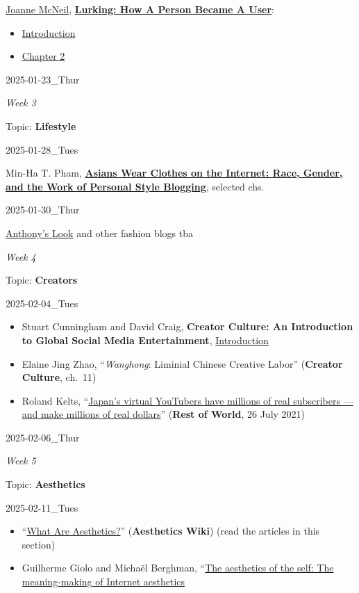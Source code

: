 \documentclass[
  letterpaper,
  DIV=11,
  numbers=noendperiod]{scrartcl}
\providecommand{\tightlist}{%
  \setlength{\itemsep}{0pt}\setlength{\parskip}{0pt}}
\begin{document}
\href{https://joannemcneil.com/}{Joanne McNeil},
\href{https://us.macmillan.com/books/9781250785756/lurking/}{\textbf{Lurking:
How A Person Became A User}}:

\begin{itemize}
\tightlist
\item
  \href{./pdf/Lurking_Intro.pdf}{Introduction}
\item
  \href{./pdf/Lurking_Chapter2.pdf}{Chapter 2}
\end{itemize}

2025-01-23\_Thur

\emph{Week 3}

Topic: \textbf{Lifestyle}

2025-01-28\_Tues

Min-Ha T. Pham,
\href{https://www.dukeupress.edu/asians-wear-clothes-on-the-internet}{\textbf{Asians
Wear Clothes on the Internet: Race, Gender, and the Work of Personal
Style Blogging}}, selected chs.

2025-01-30\_Thur

\href{https://www.instagram.com/anthonyslook/}{Anthony's Look} and other
fashion blogs tba

\emph{Week 4}

Topic: \textbf{Creators}

2025-02-04\_Tues

\begin{itemize}
\tightlist
\item
  Stuart Cunningham and David Craig, \textbf{Creator Culture: An
  Introduction to Global Social Media Entertainment},
  \href{pdf/creator-culture-toc-intro.pdf}{Introduction}
\item
  Elaine Jing Zhao, ``\emph{Wanghong}: Liminial Chinese Creative Labor''
  (\textbf{Creator Culture}, ch.~11)
\item
  Roland Kelts, ``\href{https://restofworld.org/2021/vtubers/}{Japan's
  virtual YouTubers have millions of real subscribers --- and make
  millions of real dollars}'' (\textbf{Rest of World}, 26 July 2021)
\end{itemize}

2025-02-06\_Thur

\emph{Week 5}

Topic: \textbf{Aesthetics}

2025-02-11\_Tues

\begin{itemize}
\tightlist
\item
  ``\href{https://aesthetics.fandom.com/wiki/Aesthetics_Wiki}{What Are
  Aesthetics?}'' (\textbf{Aesthetics Wiki}) (read the articles in this
  section)
\item
  Guilherme Giolo and Michaël Berghman,
  ``\href{pdf/giolo-berghman-aesthetics.pdf}{The aesthetics of the self:
  The meaning-making of Internet aesthetics}
\end{itemize}
\end{document}
